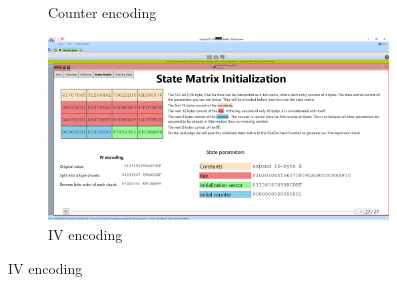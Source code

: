 \begin{figure}
\begin{subfigure}{0.5\textwidth}
  \caption{Counter encoding}
  \label{fig:statematrix.encoding.counter}
\end{subfigure}%
\begin{subfigure}{0.5\textwidth}
  \centering
  \includegraphics[width=0.99\textwidth]{figures/ct2/state-matrix/4-state-matrix-iv.png}
  \caption{IV encoding}
  \label{fig:statematrix.encoding.iv}
\end{subfigure}
\end{figure}

